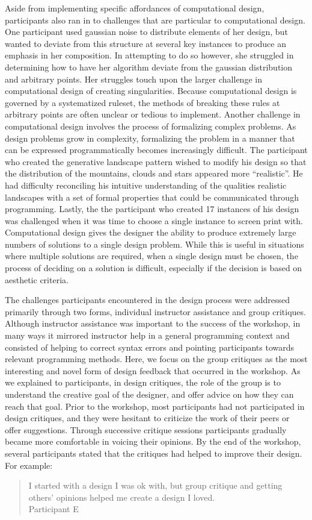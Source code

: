 \documentclass{sigchi}
\begin{document}
Aside from implementing specific affordances of computational design, participants also ran in to challenges that are particular to computational design. 
One participant used gaussian noise to distribute elements of her design, but wanted to deviate from this structure at several key instances to produce an emphasis in her composition. In attempting to do so however, she struggled in determining how to have her algorithm deviate from the gaussian distribution and arbitrary points. Her struggles touch upon the larger challenge in computational design of creating singularities. Because computational design is governed by a systematized ruleset, the methods of breaking these rules at arbitrary points are often unclear or tedious to implement. Another challenge in computational design involves the process of formalizing complex problems. As design problems grow in complexity, formalizing the problem in a manner that can be expressed programmatically becomes increasingly difficult. The participant who created the generative landscape pattern wished to modify his design so that the distribution of the mountains, clouds and stars appeared more ``realistic''. He had difficulty reconciling his intuitive understanding of the qualities realistic landscapes with a set of formal properties that could be communicated through programming. Lastly, the the participant who created 17 instances of his design was challenged when it was time to choose a single instance to screen print with. Computational design gives the designer the ability to produce extremely large numbers of solutions to a single design problem. While this is useful in situations where multiple solutions are required, when a single design must be chosen, the process of deciding on a solution is difficult, especially if the decision is based on aesthetic criteria.

The challenges participants encountered in the design process were addressed primarily through two forms, individual instructor assistance and group critiques. Although instructor assistance was important to the success of the workshop, in many ways it mirrored instructor help in a general programming context and consisted of helping to correct syntax errors and pointing participants towards relevant programming methods. Here, we focus on the group critiques as the most interesting and novel form of design feedback that occurred in the workshop. As we explained to participants, in design critiques, the role of the group is to understand the creative goal of the designer, and offer advice on how they can reach that goal. Prior to the workshop, most participants had not participated in design critiques, and they were hesitant to criticize the work of their peers or offer suggestions. Through successive critique sessions participants gradually became more comfortable in voicing their opinions. By the end of the workshop, several participants stated that the critiques had helped to improve their design. For example:
\begin{quotation}
	I started with a design I was ok with, but group critique and getting others' opinions helped me create a design I loved.
	\\Participant E
\end{quotation}
\end{document}
